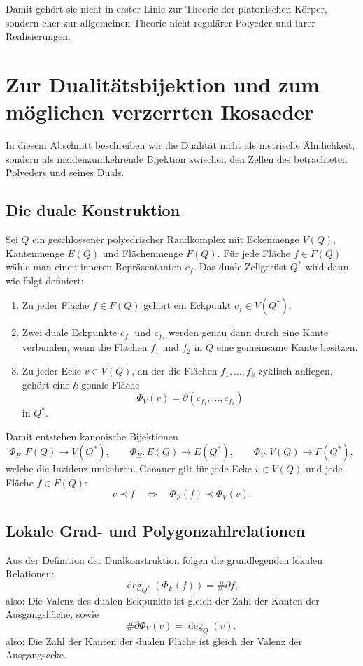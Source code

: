 \documentclass[11pt]{article}
\theoremstyle{plain}
\theoremstyle{definition}
\theoremstyle{remark}
\begin{document}
	Damit gehört sie nicht in erster Linie zur Theorie der platonischen Körper, sondern eher zur allgemeinen Theorie nicht-regulärer Polyeder und ihrer Realisierungen.
	
	\section{Zur Dualitätsbijektion und zum möglichen verzerrten Ikosaeder}
	
	In diesem Abschnitt beschreiben wir die Dualität nicht als metrische Ähnlichkeit, sondern als inzidenzumkehrende Bijektion zwischen den Zellen des betrachteten Polyeders und seines Duals.
	
	\subsection{Die duale Konstruktion}
	
	Sei \(Q\) ein geschlossener polyedrischer Randkomplex mit Eckenmenge \(V(Q)\), Kantenmenge \(E(Q)\) und Flächenmenge \(F(Q)\). Für jede Fläche \(f\in F(Q)\) wähle man einen inneren Repräsentanten \(c_f\). Das duale Zellgerüst \(Q^\ast\) wird dann wie folgt definiert:
	\begin{enumerate}
		\item Zu jeder Fläche \(f\in F(Q)\) gehört ein Eckpunkt \(c_f\in V(Q^\ast)\).
		\item Zwei duale Eckpunkte \(c_{f_1}\) und \(c_{f_2}\) werden genau dann durch eine Kante verbunden, wenn die Flächen \(f_1\) und \(f_2\) in \(Q\) eine gemeinsame Kante besitzen.
		\item Zu jeder Ecke \(v\in V(Q)\), an der die Flächen \(f_1,\dots,f_k\) zyklisch anliegen, gehört eine \(k\)-gonale Fläche
		\[
		\Phi_V(v)=\partial(c_{f_1},\dots,c_{f_k})
		\]
		in \(Q^\ast\).
	\end{enumerate}
	
	Damit entstehen kanonische Bijektionen
	\[
	\Phi_F:F(Q)\to V(Q^\ast),\qquad
	\Phi_E:E(Q)\to E(Q^\ast),\qquad
	\Phi_V:V(Q)\to F(Q^\ast),
	\]
	welche die Inzidenz umkehren. Genauer gilt für jede Ecke \(v\in V(Q)\) und jede Fläche \(f\in F(Q)\):
	\[
	v\prec f
	\quad\Longleftrightarrow\quad
	\Phi_F(f)\prec \Phi_V(v).
	\]
	
	\subsection{Lokale Grad- und Polygonzahlrelationen}
	
	Aus der Definition der Dualkonstruktion folgen die grundlegenden lokalen Relationen:
	\[
	\deg_{Q^\ast}(\Phi_F(f))=\#\partial f,
	\]
	also: Die Valenz des dualen Eckpunkts ist gleich der Zahl der Kanten der Ausgangsfläche, sowie
	\[
	\#\partial \Phi_V(v)=\deg_Q(v),
	\]
	also: Die Zahl der Kanten der dualen Fläche ist gleich der Valenz der Ausgangsecke.
	
\end{document}
